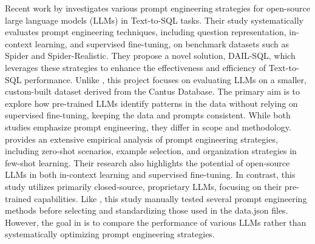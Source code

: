 Recent work by \cite{gao2023text2sql} investigates various prompt engineering strategies for open-source large language models (LLMs) in Text-to-SQL tasks. Their study systematically evaluates prompt engineering techniques, including question representation, in-context learning, and supervised fine-tuning, on benchmark datasets such as Spider and Spider-Realistic. They propose a novel solution, DAIL-SQL, which leverages these strategies to enhance the effectiveness and efficiency of Text-to-SQL performance. Unlike \cite{gao2023text2sql}, this project focuses on evaluating LLMs on a smaller, custom-built dataset derived from the Cantus Database. The primary aim is to explore how pre-trained LLMs identify patterns in the data without relying on supervised fine-tuning, keeping the data and prompts consistent. While both studies emphasize prompt engineering, they differ in scope and methodology. \cite{gao2023text2sql} provides an extensive empirical analysis of prompt engineering strategies, including zero-shot scenarios, example selection, and organization strategies in few-shot learning. Their research also highlights the potential of open-source LLMs in both in-context learning and supervised fine-tuning. In contrast, this study utilizes primarily closed-source, proprietary LLMs, focusing on their pre-trained capabilities. Like \cite{gao2023text2sql}, this study manually tested several prompt engineering methods before selecting and standardizing those used in the data.json files. However, the goal in \cite{gao2023text2sql} is to compare the performance of various LLMs rather than systematically optimizing prompt engineering strategies.

